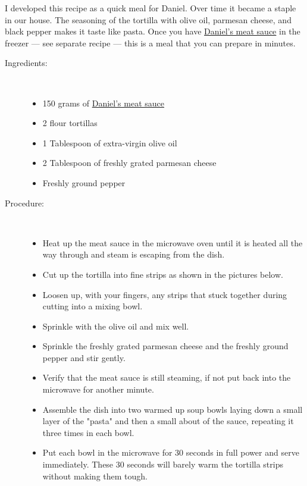 \documentclass[11pt,letterpaper]{article}
\newcommand \fileName {TortillaPasta}
\begin{document}


I developed this recipe as a quick meal for Daniel. Over time it became a staple in our house. The seasoning of the tortilla with olive oil, parmesan cheese, and black pepper makes it taste like pasta. Once you have \href{DanielsMeatSauce.html}{Daniel's meat sauce} in the freezer --- see separate recipe --- this is a meal that you can prepare in minutes.

\vspace{0.3in}
\begin{description}

\item[Ingredients:]\ \\
	\begin{itemize}
	\item 150 grams of \href{DanielsMeatSauce.html}{Daniel's meat sauce}
	\item 2 flour tortillas
	\item 1 Tablespoon of extra-virgin olive oil
	\item 2 Tablespoon of freshly grated parmesan cheese
	\item Freshly ground pepper
	\end{itemize}

\item[Procedure:]\ \\
	\begin{itemize}
	\item Heat up the meat sauce in the microwave oven until it is heated all the way through and steam is escaping from the dish.
	\item Cut up the tortilla into fine strips as shown in the pictures below. 
	\item Loosen up, with your fingers, any strips that stuck together during cutting into a mixing bowl. 
	\item  Sprinkle with the olive oil and mix well.
	\item Sprinkle the freshly grated parmesan cheese and the freshly ground pepper and stir gently.
	\item Verify that the meat sauce is still steaming, if not put back into the microwave for another minute.
	\item Assemble the dish into two warmed up soup bowls laying down a small layer of the "pasta" and then a small about of the sauce, repeating it three times in each bowl. 
	\item Put each bowl in the microwave for 30 seconds in full power and serve immediately. These 30 seconds will barely warm the tortilla strips without making them tough.
		\end{itemize}
\end{description}


\end{document}
